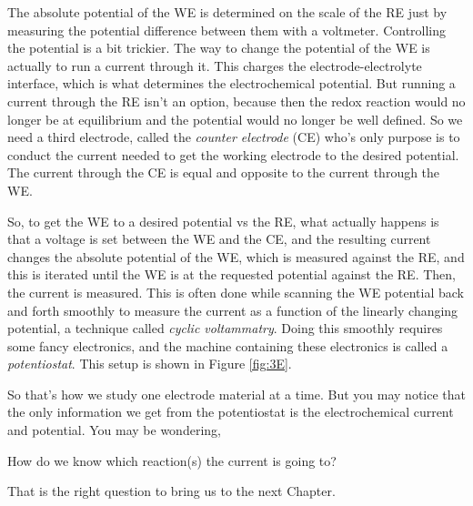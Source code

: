 The absolute potential of the WE is determined on the scale of the RE just by measuring the potential difference between them with a voltmeter. Controlling the potential is a bit trickier. The way to change the potential of the WE is actually to run a current through it. This charges the electrode-electrolyte interface, which is what determines the electrochemical potential. But running a current through the RE isn't an option, because then the redox reaction would no longer be at equilibrium and the potential would no longer be well defined. So we need a third electrode, called the \textit{counter electrode} (CE) who's only purpose is to conduct the current needed to get the working electrode to the desired potential. The current through the CE is equal and opposite to the current through the WE.

So, to get the WE to a desired potential vs the RE, what actually happens is that a voltage is set between the WE and the CE, and the resulting current changes the absolute potential of the WE, which is measured against the RE, and this is iterated until the WE is at the requested potential against the RE. Then, the current is measured. This is often done while scanning the WE potential back and forth smoothly to measure the current as a function of the linearly changing potential, a technique called \textit{cyclic voltammatry}. Doing this smoothly requires some fancy electronics, and the machine containing these electronics is called a \textit{potentiostat}. This setup is shown in Figure \ref{fig:3E}.

So that's how we study one electrode material at a time. But you may notice that the only information we get from the potentiostat is the electrochemical current and potential. You may be wondering,
\begin{question}
	How do we know which reaction(s) the current is going to?
\end{question}
That is the right question to bring us to the next Chapter.


